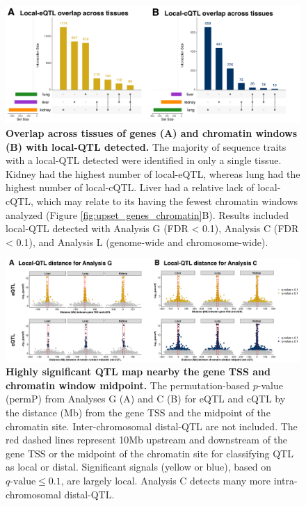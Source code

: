 \documentclass[9pt,twocolumn,twoside]{gsajnl}
\begin{document}
\begin{figure}[hp]
\renewcommand{\familydefault}{\sfdefault}\normalfont
\centering
\includegraphics[width=\textwidth, trim={0in 0in 0in 0in}, clip]{figs/upset_eqtl_cqtl.pdf}
\caption{\textbf{Overlap across tissues of genes (A) and chromatin windows (B) with local-QTL detected.} 
The majority of sequence traits with a local-QTL detected were identified in only a single tissue. Kidney had the highest number of local-eQTL, whereas lung had the highest number of local-cQTL. Liver had a relative lack of local-cQTL, which may relate to its having the fewest chromatin windows analyzed (Figure \ref{fig:upset_genes_chromatin}B). Results included local-QTL detected with Analysis G (FDR < 0.1), Analysis C (FDR < 0.1), and Analysis L (genome-wide and chromosome-wide). 
\label{fig:upset_eqtl_cqtl}}
\end{figure}

\begin{figure}[hp]
\renewcommand{\familydefault}{\sfdefault}\normalfont
\centering
\includegraphics[width=\textwidth]{figs/qtl_distance_all.png}
\caption{\textbf{Highly significant QTL map nearby the gene TSS and chromatin window midpoint.} 
The permutation-based $p$-value (permP) from Analyses G (A) and C (B) for eQTL and cQTL by the distance (Mb) from the gene TSS and the midpoint of the chromatin site. Inter-chromosomal distal-QTL are not included. The red dashed lines represent 10Mb upstream and downstream of the gene TSS or the midpoint of the chromatin site for classifying QTL as local or distal. Significant signals (yellow or blue), based on $q\text{-value} \le 0.1$, are largely local. Analysis C detects many more intra-chromosomal distal-QTL.
\label{fig:dist_all}}
\end{figure}
\end{document}
